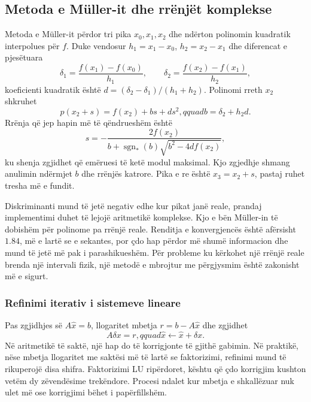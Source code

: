 \subsection{Metoda e Müller-it dhe rrënjët komplekse}
Metoda e Müller-it përdor tri pika $x_0,x_1,x_2$ dhe ndërton polinomin kuadratik interpolues për $f$. Duke vendosur $h_1=x_1-x_0$, $h_2=x_2-x_1$ dhe diferencat e pjesëtuara
\begin{equation}
 \delta_1=\frac{f(x_1)-f(x_0)}{h_1},\qquad
 \delta_2=\frac{f(x_2)-f(x_1)}{h_2},
\end{equation}
koeficienti kuadratik është $d=(\delta_2-\delta_1)/(h_1+h_2)$. Polinomi rreth $x_2$ shkruhet
\begin{equation}
 p(x_2+s)=f(x_2)+bs+ds^2,qquad b=\delta_2+h_2d.
\end{equation}
Rrënja që jep hapin më të qëndrueshëm është
\begin{equation}
 s=-\frac{2f(x_2)}{b+\operatorname{sgn}_*(b)\sqrt{b^2-4df(x_2)}},
\end{equation}
ku shenja zgjidhet që emëruesi të ketë modul maksimal. Kjo zgjedhje shmang anulimin ndërmjet $b$ dhe rrënjës katrore. Pika e re është $x_3=x_2+s$, pastaj ruhet tresha më e fundit.

Diskriminanti mund të jetë negativ edhe kur pikat janë reale, prandaj implementimi duhet të lejojë aritmetikë komplekse. Kjo e bën Müller-in të dobishëm për polinome pa rrënjë reale. Renditja e konvergjencës është afërsisht $1.84$, më e lartë se e sekantes, por çdo hap përdor më shumë informacion dhe mund të jetë më pak i parashikueshëm. Për probleme ku kërkohet një rrënjë reale brenda një intervali fizik, një metodë e mbrojtur me përgjysmim është zakonisht më e sigurt.

\subsubsection{Refinimi iterativ i sistemeve lineare}
Pas zgjidhjes së $A\widehat x=b$, llogaritet mbetja $r=b-A\widehat x$ dhe zgjidhet
\begin{equation}
 A\delta x=r,qquad \widehat x\leftarrow\widehat x+\delta x.
\end{equation}
Në aritmetikë të saktë, një hap do të korrigjonte të gjithë gabimin. Në praktikë, nëse mbetja llogaritet me saktësi më të lartë se faktorizimi, refinimi mund të rikuperojë disa shifra. Faktorizimi LU ripërdoret, kështu që çdo korrigjim kushton vetëm dy zëvendësime trekëndore. Procesi ndalet kur mbetja e shkallëzuar nuk ulet më ose korrigjimi bëhet i papërfillshëm.

